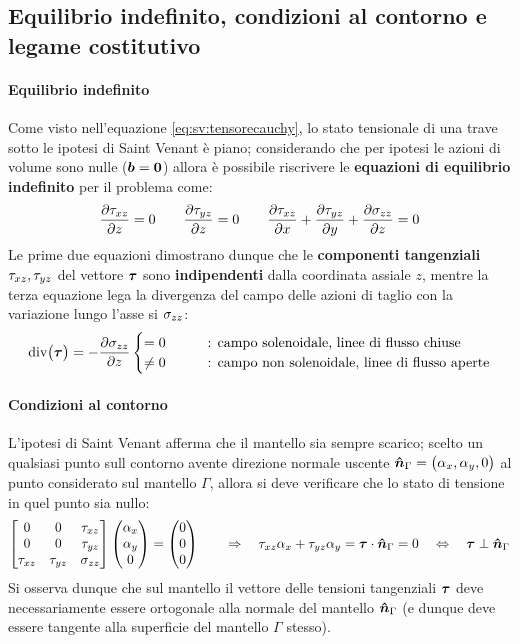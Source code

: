 	\subsection{Equilibrio indefinito, condizioni al contorno e legame costitutivo}
		\paragraph{Equilibrio indefinito} Come visto nell'equazione \ref{eq:sv:tensorecauchy}, lo stato tensionale di una trave sotto le ipotesi di Saint Venant è piano; considerando che per ipotesi le azioni di volume sono nulle ($\boldsymbol{b}=\boldsymbol{0}$) allora è possibile riscrivere le \textbf{equazioni di equilibrio indefinito} per il problema come:
		\[ \frac{\partial \tau_{xz}}{\partial z} = 0 \qquad \frac{\partial \tau_{yz}}{\partial z} = 0 \qquad \frac{\partial \tau_{xz}}{\partial x} + \frac{\partial \tau_{yz}}{\partial y} + \frac{\partial \sigma_{zz}}{\partial z} = 0 \]
		Le prime due equazioni dimostrano dunque che le \textbf{componenti tangenziali} $\tau_{xz},\tau_{yz}$ del vettore $\boldsymbol{\tau}$ sono \textbf{indipendenti} dalla coordinata assiale $z$, mentre la terza equazione lega la divergenza del campo delle azioni di taglio con la variazione lungo l'asse si $\sigma_{zz}$:
		\[ \textrm{div} \big(\boldsymbol{\tau} \big) = - \frac{\partial \sigma_{zz}}{\partial z} \begin{cases}
			= 0 \qquad & \textrm{: campo solenoidale, linee di flusso chiuse} \\
			\neq 0 \qquad & \textrm{: campo non solenoidale, linee di flusso aperte} \\
		\end{cases} \]
	
		\paragraph{Condizioni al contorno} L'ipotesi di Saint Venant afferma che il mantello sia sempre scarico; scelto un qualsiasi punto sull contorno avente direzione normale uscente $\boldsymbol{\hat{n}}_\Gamma = \big(\alpha_x,\alpha_y,0\big)$ al punto considerato sul mantello $\Gamma$, allora si deve verificare che lo stato di tensione in quel punto sia nullo:
		\[  \begin{bmatrix} 
			0 & 0 & \tau_{xz} \\ 0 & 0 & \tau_{yz} \\ \tau_{xz} & \tau_{yz} & \sigma_{zz}
		\end{bmatrix} \begin{pmatrix}
			\alpha_x \\ \alpha_y \\ 0 
		\end{pmatrix} = \begin{pmatrix}
			0 \\ 0 \\ 0
		\end{pmatrix} \qquad \Rightarrow\quad \tau_{xz} \alpha_x + \tau_{yz} \alpha_y = \boldsymbol{\tau} \cdot \boldsymbol{\hat{n}}_\Gamma = 0 \quad \Leftrightarrow \quad \boldsymbol{\tau} \perp \boldsymbol{\hat{n}}_\Gamma \]
		Si osserva dunque che sul mantello il vettore delle tensioni tangenziali $\boldsymbol{\tau}$ deve necessariamente essere ortogonale alla normale del mantello $\boldsymbol{\hat{n}}_\Gamma$ (e dunque deve essere tangente alla superficie del mantello $\Gamma$ stesso).
		
